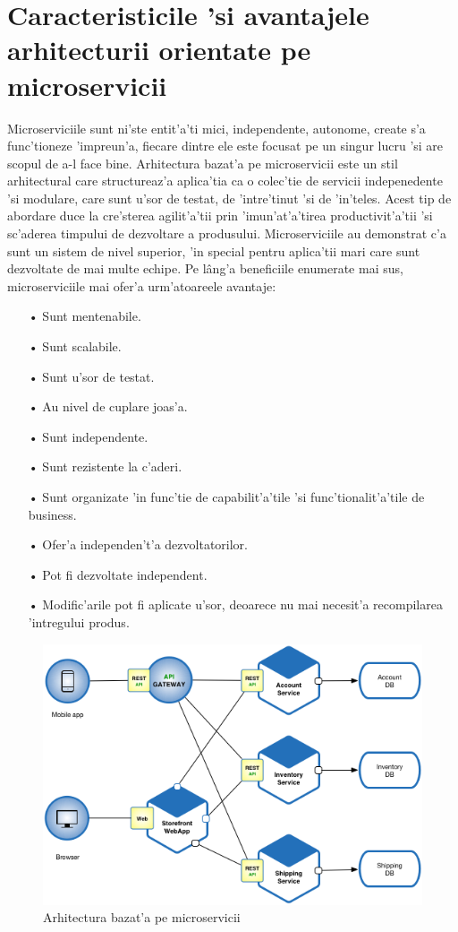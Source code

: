 \documentclass[12pt,a4paper,twoside]{report}
\begin{document}
\section{Caracteristicile 'si avantajele arhitecturii orientate pe microservicii}
Microserviciile sunt ni'ste entit'a'ti mici, independente, autonome, create s'a func'tioneze 'impreun'a, fiecare dintre ele este focusat pe un singur lucru 'si  are scopul de a-l face bine.
Arhitectura bazat'a pe microservicii este un stil arhitectural care structureaz'a aplica'tia ca o colec'tie de servicii indepenedente 'si modulare, care sunt u'sor de testat, de 'intre'tinut 'si de 'in'teles.
Acest tip de abordare duce la cre'sterea agilit'a'tii prin 'imun'at'a'tirea productivit'a'tii 'si sc'aderea timpului de dezvoltare a produsului.
Microserviciile au demonstrat c'a sunt un sistem de nivel superior, 'in special pentru aplica'tii mari care sunt dezvoltate de mai multe echipe.
 Pe lâng'a beneficiile enumerate mai sus, microserviciile mai ofer'a urm'atoareele avantaje:
\begin{itemize}
\item[•] Sunt mentenabile.
\item[•] Sunt scalabile.
\item[•] Sunt u'sor de testat.
\item[•] Au nivel de cuplare joas'a.
\item[•] Sunt independente. 
\item[•] Sunt rezistente la c'aderi.
\item[•] Sunt organizate 'in func'tie de capabilit'a'tile 'si func'tionalit'a'tile de business.
\item[•] Ofer'a independen't'a dezvoltatorilor.
\item[•] Pot fi dezvoltate independent.
\item[•] Modific'arile pot fi aplicate u'sor, deoarece nu mai necesit'a recompilarea 'intregului produs.
\end{itemize}
\begin{figure}[H]
\begin{center}
\advance\leftskip-3cm
\advance\rightskip-3cm
\includegraphics[keepaspectratio=true,scale=0.55]{img/Microservice_Architecture.png}
\caption{Arhitectura bazat'a pe microservicii}
\label{microservices_arch}
\end{center}
\end{figure}
\end{document}
